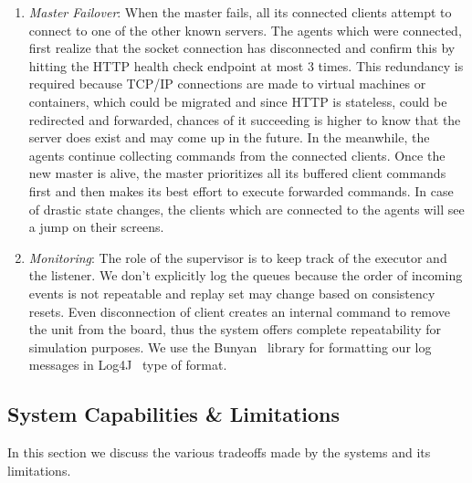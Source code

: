 \documentclass[a4paper]{IEEEtran}
\begin{document}
\begin{enumerate}
    \item \emph{Master Failover}: When the master fails, all its connected clients attempt to connect to one of the other known servers. The agents which were connected, first realize that the socket connection has disconnected and confirm this by hitting the HTTP health check endpoint at most 3 times. This redundancy is required because TCP/IP connections are made to virtual machines or containers, which could be migrated and since HTTP is stateless, could be redirected and forwarded, chances of it succeeding is higher to know that the server does exist and may come up in the future. In the meanwhile, the agents continue collecting commands from the connected clients. Once the new master is alive, the master prioritizes all its buffered client commands first and then makes its best effort to execute forwarded commands. In case of drastic state changes, the clients which are connected to the agents will see a jump on their screens.

    \item \emph{Monitoring}: The role of the supervisor is to keep track of the executor and the listener. We don't explicitly log the queues because the order of incoming events is not repeatable and replay set may change based on consistency resets. Even disconnection of client creates an internal command to remove the unit from the board, thus the system offers complete repeatability for simulation purposes. We use the Bunyan~\cite{bunyan} library for formatting our log messages in Log4J~\cite{log4j} type of format.
 
  \end{enumerate}
  
  \subsection{System Capabilities \& Limitations}
  
  In this section we discuss the various tradeoffs made by the systems and its limitations.
  
\end{document}
